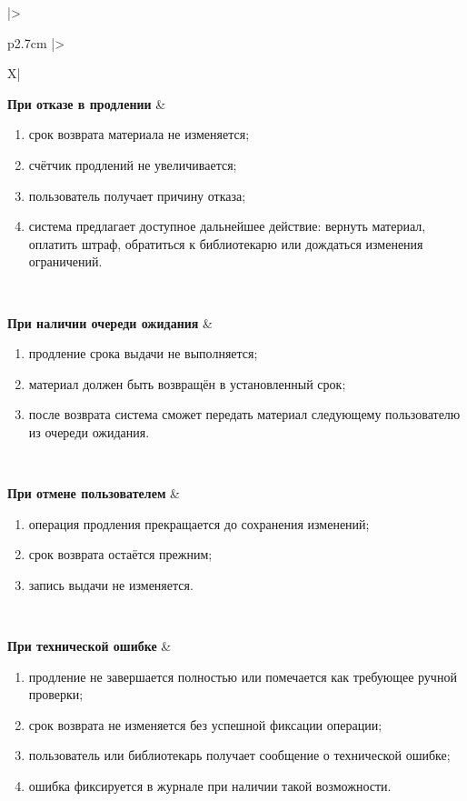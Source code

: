 \documentclass[12pt,a4paper]{article}
\begin{document}
\begin{xltabular}{\textwidth}{
				|>{\raggedright\arraybackslash}p{2.7cm}
				|>{\raggedright\arraybackslash}X|
			}
			\textbf{При отказе в продлении} &
			\begin{enumerate}
				\item срок возврата материала не изменяется;
				\item счётчик продлений не увеличивается;
				\item пользователь получает причину отказа;
				\item система предлагает доступное дальнейшее действие: вернуть
				материал, оплатить штраф, обратиться к библиотекарю или дождаться
				изменения ограничений.
			\end{enumerate} \\
			\hline
			
			\textbf{При наличии очереди ожидания} &
			\begin{enumerate}
				\item продление срока выдачи не выполняется;
				\item материал должен быть возвращён в установленный срок;
				\item после возврата система сможет передать материал следующему
				пользователю из очереди ожидания.
			\end{enumerate} \\
			\hline
			
			\textbf{При отмене пользователем} &
			\begin{enumerate}
				\item операция продления прекращается до сохранения изменений;
				\item срок возврата остаётся прежним;
				\item запись выдачи не изменяется.
			\end{enumerate} \\
			\hline
			
			\textbf{При технической ошибке} &
			\begin{enumerate}
				\item продление не завершается полностью или помечается как требующее
				ручной проверки;
				\item срок возврата не изменяется без успешной фиксации операции;
				\item пользователь или библиотекарь получает сообщение о технической
				ошибке;
				\item ошибка фиксируется в журнале при наличии такой возможности.
			\end{enumerate} \\
			\hline
			
		\end{xltabular}
		
\end{document}

